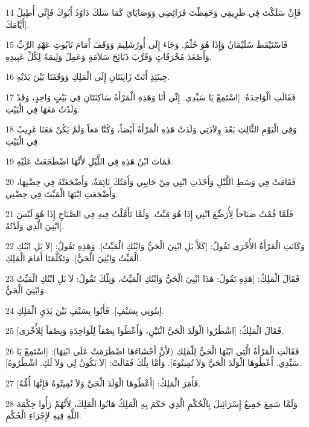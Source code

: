 \par 14 فَإِنْ سَلَكْتَ فِي طَرِيقِي وَحَفِظْتَ فَرَائِضِي وَوَصَايَايَ كَمَا سَلَكَ دَاوُدُ أَبُوكَ فَإِنِّي أُطِيلُ أَيَّامَكَ].
\par 15 فَاسْتَيْقَظَ سُلَيْمَانُ وَإِذَا هُوَ حُلْمٌ. وَجَاءَ إِلَى أُورُشَلِيمَ وَوَقَفَ أَمَامَ تَابُوتِ عَهْدِ الرَّبِّ وَأَصْعَدَ مُحْرَقَاتٍ وَقَرَّبَ ذَبَائِحَ سَلاَمَةٍ وَعَمِلَ وَلِيمَةً لِكُلِّ عَبِيدِهِ.
\par 16 حِينَئِذٍ أَتَتْ زَانِيَتَانِ إِلَى الْمَلِكِ وَوَقَفَتَا بَيْنَ يَدَيْهِ.
\par 17 فَقَالَتِ الْوَاحِدَةُ: [اسْتَمِعْ يَا سَيِّدِي. إِنِّي أَنَا وَهَذِهِ الْمَرْأَةُ سَاكِنَتَانِ فِي بَيْتٍ وَاحِدٍ، وَقَدْ وَلَدْتُ مَعَهَا فِي الْبَيْتِ.
\par 18 وَفِي الْيَوْمِ الثَّالِثِ بَعْدَ وِلاَدَتِي وَلَدَتْ هَذِهِ الْمَرْأَةُ أَيْضاً، وَكُنَّا مَعاً وَلَمْ يَكُنْ مَعَنَا غَرِيبٌ فِي الْبَيْتِ.
\par 19 فَمَاتَ ابْنُ هَذِهِ فِي اللَّيْلِ لأَنَّهَا اضْطَجَعَتْ عَلَيْهِ.
\par 20 فَقَامَتْ فِي وَسَطِ اللَّيْلِ وَأَخَذَتِ ابْنِي مِنْ جَانِبِي وَأَمَتُكَ نَائِمَةٌ، وَأَضْجَعَتْهُ فِي حِضْنِهَا، وَأَضْجَعَتِ ابْنَهَا الْمَيِّتَ فِي حِضْنِي.
\par 21 فَلَمَّا قُمْتُ صَبَاحاً لِأُرَضِّعَ ابْنِي إِذَا هُوَ مَيِّتٌ. وَلَمَّا تَأَمَّلْتُ فِيهِ فِي الصَّبَاحِ إِذَا هُوَ لَيْسَ ابْنِيَ الَّذِي وَلَدْتُهُ].
\par 22 وَكَانَتِ الْمَرْأَةُ الأُخْرَى تَقُولُ: [كَلاَّ بَلِ ابْنِيَ الْحَيُّ وَابْنُكِ الْمَيِّتُ]. وَهَذِهِ تَقُولُ: [لاَ بَلِ ابْنُكِ الْمَيِّتُ وَابْنِيَ الْحَيُّ]. وَتَكَلَّمَتَا أَمَامَ الْمَلِكِ.
\par 23 فَقَالَ الْمَلِكُ: [هَذِهِ تَقُولُ: هَذَا ابْنِيَ الْحَيُّ وَابْنُكِ الْمَيِّتُ، وَتِلْكَ تَقُولُ: لاَ بَلِ ابْنُكِ الْمَيِّتُ وَابْنِيَ الْحَيُّ.
\par 24 اِيتُونِي بِسَيْفٍ]. فَأَتُوا بِسَيْفٍ بَيْنَ يَدَيِ الْمَلِكِ.
\par 25 فَقَالَ الْمَلِكُ: [اشْطُرُوا الْوَلَدَ الْحَيَّ اثْنَيْنِ، وَأَعْطُوا نِصْفاً لِلْوَاحِدَةِ وَنِصْفاً لِلأُخْرَى].
\par 26 فَقَالَتِ الْمَرْأَةُ الَّتِي ابْنُهَا الْحَيُّ لِلْمَلِكِ (لأَنَّ أَحْشَاءَهَا اضْطَرَمَتْ عَلَى ابْنِهَا): [اسْتَمِعْ يَا سَيِّدِي. أَعْطُوهَا الْوَلَدَ الْحَيَّ وَلاَ تُمِيتُوهُ]. وَأَمَّا تِلْكَ فَقَالَتْ: [لاَ يَكُونُ لِي وَلاَ لَكِ. اشْطُرُوهُ].
\par 27 فَأَمَرَ الْمَلِكُ: [أَعْطُوهَا الْوَلَدَ الْحَيَّ وَلاَ تُمِيتُوهُ فَإِنَّهَا أُمُّهُ].
\par 28 وَلَمَّا سَمِعَ جَمِيعُ إِسْرَائِيلَ بِالْحُكْمِ الَّذِي حَكَمَ بِهِ الْمَلِكُ هَابُوا الْمَلِكَ، لأَنَّهُمْ رَأُوا حِكْمَةَ اللَّهِ فِيهِ لإِجْرَاءِ الْحُكْمِ.

